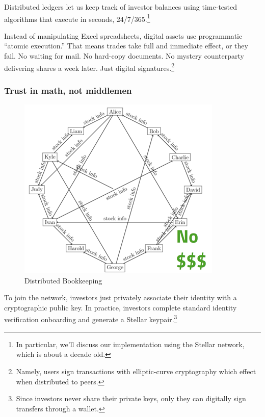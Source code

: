 \documentclass[11pt, english]{article}
\begin{document}
\begin{multicols}{2}
Distributed ledgers let us keep track of investor balances using time-tested algorithms that execute in seconds, 24/7/365.\footnote{In particular, we'll discuss our implementation using the Stellar network, which is about a decade old.}

Instead of manipulating Excel spreadsheets, digital assets use programmatic ``atomic execution.'' That means trades take full and immediate effect, or they fail. No waiting for mail. No hard-copy documents. No mystery counterparty delivering shares a week later. Just digital signatures.\footnote{Namely, users sign transactions with elliptic-curve cryptography which effect when distributed to peers.}

\subsubsection{Trust in math, not middlemen}

\begin{figure}[H]
    \centering
    \includegraphics[width=\linewidth]{decentralized.png}
    \caption{Distributed Bookkeeping}
    \label{fig:decentralized}
\end{figure}

To join the network, investors just privately associate their identity with a cryptographic public key. In practice, investors complete standard identity verification onboarding and generate a Stellar keypair.\footnote{Since investors never share their private keys, only they can digitally sign transfers through a wallet.}


\end{multicols}
\end{document}
